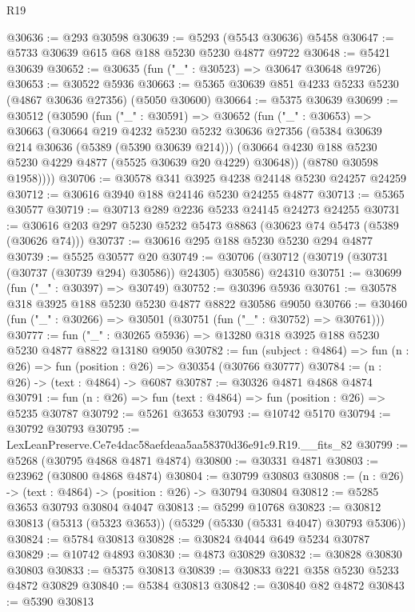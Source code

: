 \begin{lexlean}{R19}
\begin{coremodule}
@30636 := @293 @30598
@30639 := @5293 (@5543 @30636) @5458
@30647 := @5733 @30639 @615 @68 @188 @5230 @5230 @4877 @9722
@30648 := @5421 @30639
@30652 := @30635 (fun ("_" : @30523) => @30647 @30648 @9726)
@30653 := @30522 @5936
@30663 := @5365 @30639 @851 @4233 @5233 @5230 (@4867 @30636 @27356) (@5050 @30600)
@30664 := @5375 @30639
@30699 := @30512
    (@30590
      (fun ("_" : @30591) =>
      @30652
        (fun ("_" : @30653) =>
        @30663
          (@30664
            @219
            @4232
            @5230
            @5232
            @30636
            @27356
            (@5384 @30639 @214 @30636 (@5389 (@5390 @30639 @214)))
            (@30664 @4230 @188 @5230 @5230 @4229 @4877 (@5525 @30639 @20 @4229) @30648))
          (@8780 @30598 @1958))))
@30706 := @30578 @341 @3925 @4238 @24148 @5230 @24257 @24259
@30712 := @30616 @3940 @188 @24146 @5230 @24255 @4877
@30713 := @5365 @30577
@30719 := @30713 @289 @2236 @5233 @24145 @24273 @24255
@30731 := @30616 @203 @297 @5230 @5232 @5473 @8863 (@30623 @74 @5473 (@5389 (@30626 @74)))
@30737 := @30616 @295 @188 @5230 @5230 @294 @4877
@30739 := @5525 @30577 @20
@30749 := @30706 (@30712 (@30719 (@30731 (@30737 (@30739 @294) @30586)) @24305) @30586) @24310
@30751 := @30699 (fun ("_" : @30397) => @30749)
@30752 := @30396 @5936
@30761 := @30578 @318 @3925 @188 @5230 @5230 @4877 @8822 @30586 @9050
@30766 := @30460 (fun ("_" : @30266) => @30501 (@30751 (fun ("_" : @30752) => @30761)))
@30777 := fun ("_" : @30265 @5936) => @13280 @318 @3925 @188 @5230 @5230 @4877 @8822 @13180 @9050
@30782 := fun (subject : @4864) => fun (n : @26) => fun (position : @26) => @30354 (@30766 @30777)
@30784 := (n : @26) -> (text : @4864) -> @6087
@30787 := @30326 @4871 @4868 @4874
@30791 := fun (n : @26) => fun (text : @4864) => fun (position : @26) => @5235 @30787
@30792 := @5261 @3653
@30793 := @10742 @5170
@30794 := @30792 @30793
@30795 := LexLeanPreserve.Ce7e4dac58aefdeaa5aa58370d36e91c9.R19.__fits_82
@30799 := @5268 (@30795 @4868 @4871 @4874)
@30800 := @30331 @4871
@30803 := @23962 (@30800 @4868 @4874)
@30804 := @30799 @30803
@30808 := (n : @26) -> (text : @4864) -> (position : @26) -> @30794 @30804
@30812 := @5285 @3653 @30793 @30804 @4047
@30813 := @5299 @10768
@30823 := @30812 @30813 (@5313 (@5323 @3653)) (@5329 (@5330 (@5331 @4047) @30793 @5306))
@30824 := @5784 @30813
@30828 := @30824 @4044 @649 @5234 @30787
@30829 := @10742 @4893
@30830 := @4873 @30829
@30832 := @30828 @30830 @30803
@30833 := @5375 @30813
@30839 := @30833 @221 @358 @5230 @5233 @4872 @30829
@30840 := @5384 @30813
@30842 := @30840 @82 @4872
@30843 := @5390 @30813

\end{coremodule}
\end{lexlean}

